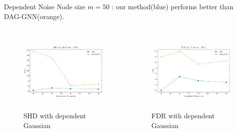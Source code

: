 \documentclass{beamer}
\begin{document}
\begin{frame}[allowframebreaks]{Dependent Noise}
    Node size $m=50$ : our method(blue) performs better than DAG-GNN(orange).
    \begin{columns}
        \begin{column}{0.5\textwidth}
            \begin{figure}
                \centering
                \includegraphics[height=4cm]{fig/SHD_dependence_50_DAG_threshold0.3.pdf}
                \caption{SHD with dependent Gaussian}
                \label{fig:dep_gaussian_shd_50}
            \end{figure}
        \end{column}
        \begin{column}{0.5\textwidth}
            \begin{figure}
                \centering
                \includegraphics[height=4cm]{fig/FDR_dependence_50_DAG_threshold0.3.pdf}
                \caption{FDR with dependent Gaussian}
                \label{fig:dep_gaussian_fdr_50}
            \end{figure}
        \end{column}
    \end{columns}


\end{frame}
\end{document}
